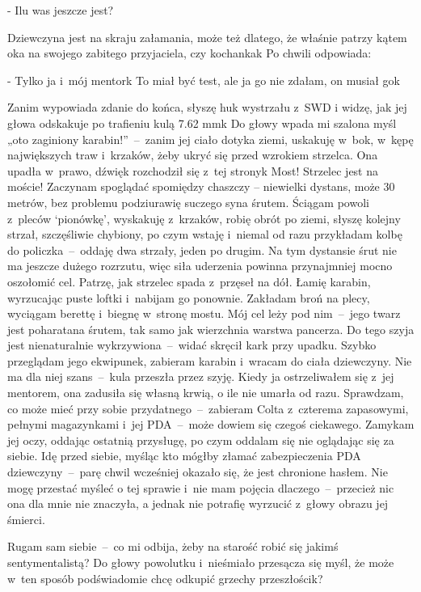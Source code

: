 \documentclass[../MAIN.tex]{subfiles}
\begin{document}
- Ilu was jeszcze jest?

Dziewczyna jest na skraju załamania, może też dlatego, że
właśnie patrzy kątem oka na swojego zabitego przyjaciela, czy
kochanka\3k Po chwili odpowiada:

- Tylko ja i~mój mentor\3k To miał być test, ale ja go nie
zdałam, on musiał go\3k

Zanim wypowiada zdanie do końca, słyszę huk wystrzału z~SWD i
widzę, jak jej głowa odskakuje po trafieniu kulą 7.62 mm\3k Do
głowy wpada mi szalona myśl „oto zaginiony karabin!”~--~zanim
jej ciało dotyka ziemi, uskakuję w~bok, w~kępę największych
traw i~krzaków, żeby ukryć się przed wzrokiem strzelca. Ona
upadła w~prawo, dźwięk rozchodził się z~tej strony\3k Most!
Strzelec jest na moście! Zaczynam spoglądać spomiędzy chaszczy
– niewielki dystans, może 30 metrów, bez problemu podziurawię
suczego syna śrutem. Ściągam powoli z~pleców ‘pionówkę’,
wyskakuję z~krzaków, robię obrót po ziemi, słyszę kolejny
strzał, szczęśliwie chybiony, po czym wstaję i~niemal od razu
przykładam kolbę do policzka~--~oddaję dwa strzały, jeden po
drugim. Na tym dystansie śrut nie ma jeszcze dużego rozrzutu,
więc siła uderzenia powinna przynajmniej mocno oszołomić cel.
Patrzę, jak strzelec spada z~przęseł na dół. Łamię karabin,
wyrzucając puste loftki i~nabijam go ponownie. Zakładam broń na
plecy, wyciągam berettę i~biegnę w~stronę mostu. Mój cel leży
pod nim~--~jego twarz jest poharatana śrutem, tak samo jak
wierzchnia warstwa pancerza. Do tego szyja jest nienaturalnie
wykrzywiona~--~widać skręcił kark przy upadku. Szybko
przeglądam
jego ekwipunek, zabieram karabin i~wracam do ciała dziewczyny.
Nie ma dla niej szans~--~kula przeszła przez szyję. Kiedy ja
ostrzeliwałem się z~jej mentorem, ona zadusiła się własną
krwią, o ile nie umarła od razu. Sprawdzam, co może mieć przy
sobie przydatnego~--~zabieram Colta z~czterema zapasowymi,
pełnymi magazynkami i~jej PDA~--~może dowiem się czegoś
ciekawego. Zamykam jej oczy, oddając ostatnią przysługę, po
czym oddalam się nie oglądając się za siebie.
%
%
Idę przed siebie, myśląc kto mógłby złamać zabezpieczenia PDA
dziewczyny~--~parę chwil wcześniej okazało się, że jest
chronione hasłem. Nie mogę przestać myśleć o tej sprawie i~nie
mam pojęcia dlaczego~--~przecież nic ona dla mnie nie znaczyła,
a jednak nie potrafię wyrzucić z~głowy obrazu jej śmierci.

Rugam sam siebie~--~co mi odbija, żeby na starość robić się
jakimś sentymentalistą? Do głowy powolutku i~nieśmiało
przesącza się myśl, że może w~ten sposób podświadomie chcę
odkupić grzechy przeszłości\3k?
\end{document}
